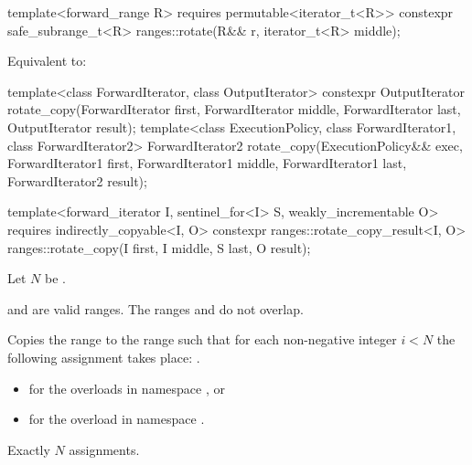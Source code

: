 \begin{itemdecl}
template<forward_range R>
  requires permutable<iterator_t<R>>
  constexpr safe_subrange_t<R> ranges::rotate(R&& r, iterator_t<R> middle);
\end{itemdecl}

\begin{itemdescr}
\pnum
\effects
Equivalent to:
\end{itemdescr}

%
\begin{itemdecl}
template<class ForwardIterator, class OutputIterator>
  constexpr OutputIterator
    rotate_copy(ForwardIterator first, ForwardIterator middle, ForwardIterator last,
                OutputIterator result);
template<class ExecutionPolicy, class ForwardIterator1, class ForwardIterator2>
  ForwardIterator2
    rotate_copy(ExecutionPolicy&& exec,
                ForwardIterator1 first, ForwardIterator1 middle, ForwardIterator1 last,
                ForwardIterator2 result);

  template<forward_iterator I, sentinel_for<I> S, weakly_incrementable O>
    requires indirectly_copyable<I, O>
    constexpr ranges::rotate_copy_result<I, O>
      ranges::rotate_copy(I first, I middle, S last, O result);
\end{itemdecl}

\begin{itemdescr}
\pnum
Let $N$ be .

\pnum
\expects
{} and  are valid ranges.
The ranges  and 
do not overlap.

\pnum
\effects
Copies the range  to the range 
such that for each non-negative integer $i < N$
the following assignment takes place:
.

\pnum
\returns
\begin{itemize}
\item
   for the overloads in namespace , or
\item
   for the overload in namespace .
\end{itemize}

\pnum
\complexity
Exactly $N$ assignments.
\end{itemdescr}


